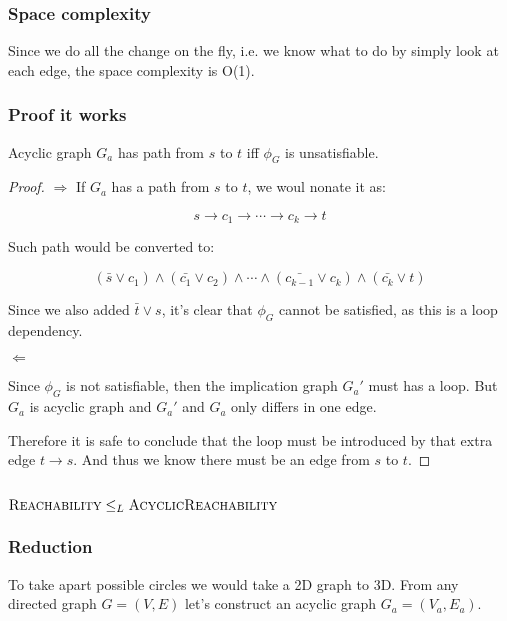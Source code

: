 \subsubsection*{Space complexity}

Since we do all the change on the fly, i.e. we know what to do by simply look at each edge, the space complexity is O(1).

\subsubsection*{Proof it works}

\begin{theorem}
    Acyclic graph $G_a$ has path from $s$ to $t$ iff $\phi_G$ is unsatisfiable.
\end{theorem}
\begin{proof}
    $\Rightarrow$ If $G_a$ has a path from $s$ to $t$, we woul nonate it as:

    $$s \rightarrow c_1 \rightarrow \cdots \rightarrow c_k \rightarrow t$$

    Such path would be converted to:

    $$(\bar{s} \vee c_1) \wedge (\bar{c_1} \vee c_2) \wedge \cdots \wedge (\bar{c_{k-1}} \vee c_k) \wedge (\bar{c_k} \vee t)$$

    Since we also added $\bar{t} \vee s$, it's clear that $\phi_G$ cannot be satisfied, as this is a loop dependency.

    $\Leftarrow$

    Since $\phi_G$ is not satisfiable, then the implication graph $G_a'$ must has a loop.
    But $G_a$ is acyclic graph and $G_a'$ and $G_a$ only differs in one edge.

    Therefore it is safe to conclude that the loop must be introduced by that extra edge $t \rightarrow s$.
    And thus we know there must be an edge from $s$ to $t$.
\end{proof}

\subsection*{$\textsc{Reachability} \le_L \textsc{AcyclicReachability}$}

\subsubsection*{Reduction}

To take apart possible circles we would take a 2D graph to 3D.
From any directed graph $G = (V, E)$ let's construct an acyclic graph $G_a = (V_a, E_a)$.

